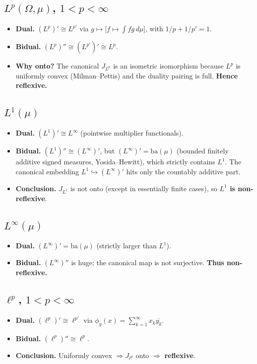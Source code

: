\documentclass[12pt,a4paper]{article}
\theoremstyle{plain}
\theoremstyle{definition}
\theoremstyle{remark}
\theoremstyle{remark}
\theoremstyle{definition}
\begin{document}
\subsection*{$L^p(\Omega,\mu)$, $1<p<\infty$}
\begin{itemize}
	\item \textbf{Dual.} $(L^p)'\cong L^{p'}$ via $g\mapsto\big[f\mapsto\!\int f g\,d\mu\big]$, with $1/p+1/p'=1$.
	\item \textbf{Bidual.} $(L^p)''\cong (L^{p'})'\cong L^p$.
	\item \textbf{Why onto?} The canonical $J_{L^p}$ is an isometric isomorphism because $L^p$ is uniformly convex (Milman--Pettis) and the duality pairing is full. \textbf{Hence reflexive.}
\end{itemize}

\subsection*{$L^1(\mu)$}
\begin{itemize}
	\item \textbf{Dual.} $(L^1)'\cong L^\infty$ (pointwise multiplier functionals).
	\item \textbf{Bidual.} $(L^1)''\cong (L^\infty)'$, but $(L^\infty)'=\mathrm{ba}(\mu)$ (bounded finitely additive signed measures, Yosida--Hewitt), which strictly contains $L^1$. The canonical embedding $L^1\hookrightarrow (L^\infty)'$ hits only the countably additive part.
	\item \textbf{Conclusion.} $J_{L^1}$ is not onto (except in essentially finite cases), so \textbf{$L^1$ is non-reflexive}.
\end{itemize}

\subsection*{$L^\infty(\mu)$}
\begin{itemize}
	\item \textbf{Dual.} $(L^\infty)'=\mathrm{ba}(\mu)$ (strictly larger than $L^1$).
	\item \textbf{Bidual.} $(L^\infty)''$ is huge; the canonical map is not surjective. \textbf{Thus non-reflexive.}
\end{itemize}

\subsection*{$\ell^p$, $1<p<\infty$}
\begin{itemize}
	\item \textbf{Dual.} $(\ell^p)'\cong \ell^{p'}$ via $\phi_y(x)=\sum_{k=1}^\infty x_k\overline{y_k}$.
	\item \textbf{Bidual.} $(\ell^p)''\cong \ell^p$.
	\item \textbf{Conclusion.} Uniformly convex $\Rightarrow J_{\ell^p}$ onto $\Rightarrow$ \textbf{reflexive}.
\end{itemize}
\end{document}
